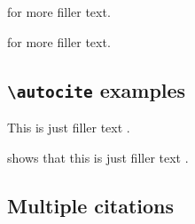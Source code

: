 \documentclass[a4paper]{article}
\newcommand{\cmd}[1]{\texttt{\textbackslash #1}}
\begin{document}
\textcite[See][]{aristotle:rhetoric} for more filler text.

\textcite[See][59--63]{aristotle:rhetoric} for more filler text.

\subsection*{\cmd{autocite} examples}


This is just filler text \autocite{aristotle:rhetoric}.

\citeauthor{aristotle:rhetoric} shows that this is just filler
text \autocite*{aristotle:rhetoric}.

\subsection*{Multiple citations}


\cite{aristotle:rhetoric,averroes/bland,aristotle:physics,aristotle:poetics}

\clearpage
\printbibliography
\end{document}
